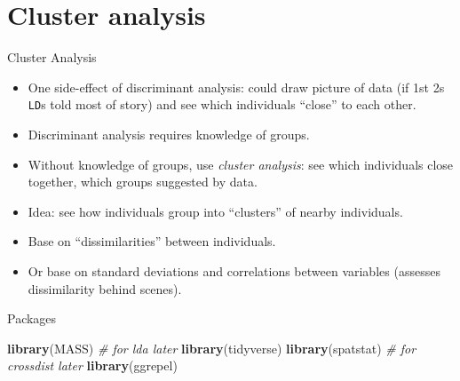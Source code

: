 \documentclass[
  ignorenonframetext,
]{beamer}
\newenvironment{Shaded}{\begin{snugshade}}{\end{snugshade}}
\newcommand{\CommentTok}[1]{\textcolor[rgb]{0.56,0.35,0.01}{\textit{#1}}}
\newcommand{\KeywordTok}[1]{\textcolor[rgb]{0.13,0.29,0.53}{\textbf{#1}}}
\newcommand{\NormalTok}[1]{#1}
\begin{document}
\hypertarget{cluster-analysis}{%
\section{Cluster analysis}\label{cluster-analysis}}

\begin{frame}[fragile]{Cluster Analysis}
\protect\hypertarget{cluster-analysis-1}{}

\begin{itemize}
\item
  One side-effect of discriminant analysis: could draw picture of data
  (if 1st 2s \texttt{LD}s told most of story) and see which individuals
  ``close'' to each other.
\item
  Discriminant analysis requires knowledge of groups.
\item
  Without knowledge of groups, use \emph{cluster analysis}: see which
  individuals close together, which groups suggested by data.
\item
  Idea: see how individuals group into ``clusters'' of nearby
  individuals.
\item
  Base on ``dissimilarities'' between individuals.
\item
  Or base on standard deviations and correlations between variables
  (assesses dissimilarity behind scenes).
\end{itemize}

\end{frame}

\begin{frame}[fragile]{Packages}
\protect\hypertarget{packages-7}{}

\begin{Shaded}
\begin{Highlighting}[]
\KeywordTok{library}\NormalTok{(MASS) }\CommentTok{# for lda later}
\KeywordTok{library}\NormalTok{(tidyverse)}
\KeywordTok{library}\NormalTok{(spatstat) }\CommentTok{# for crossdist later}
\KeywordTok{library}\NormalTok{(ggrepel)}
\end{Highlighting}
\end{Shaded}

\end{frame}
\end{document}

